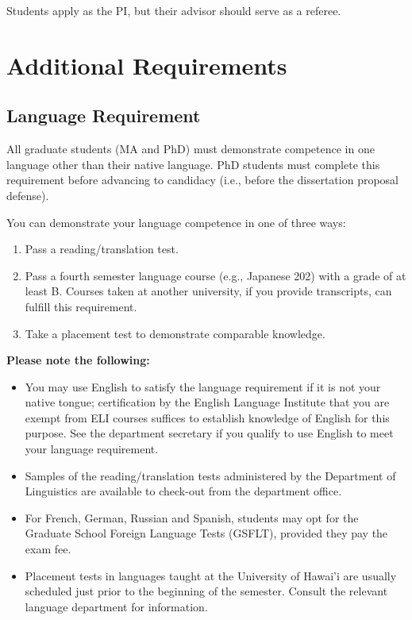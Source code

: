 \documentclass[
]{book}
\providecommand{\tightlist}{%
  \setlength{\itemsep}{0pt}\setlength{\parskip}{0pt}}
\begin{document}
Students apply as the PI, but their advisor should serve as a referee.

\chapter{Additional Requirements}\label{additional-requirements}

\section{Language Requirement}\label{language-requirement}

All graduate students (MA and PhD) must demonstrate competence in one language other than their native language. PhD students must complete this requirement before advancing to candidacy (i.e., before the dissertation proposal defense).

You can demonstrate your language competence in one of three ways:

\begin{enumerate}
\def\labelenumi{\arabic{enumi}.}
\tightlist
\item
  Pass a reading/translation test.
\item
  Pass a fourth semester language course (e.g., Japanese 202) with a grade of at least B. Courses taken at another university, if you provide transcripts, can fulfill this requirement.
\item
  Take a placement test to demonstrate comparable knowledge.
\end{enumerate}

\textbf{Please note the following:}

\begin{itemize}
\tightlist
\item
  You may use English to satisfy the language requirement if it is not your native tongue; certification by the English Language Institute that you are exempt from ELI courses suffices to establish knowledge of English for this purpose. See the department secretary if you qualify to use English to meet your language requirement.
\item
  Samples of the reading/translation tests administered by the Department of Linguistics are available to check-out from the department office.
\item
  For French, German, Russian and Spanish, students may opt for the Graduate School Foreign Language Tests (GSFLT), provided they pay the exam fee.
\item
  Placement tests in languages taught at the University of Hawai'i are usually scheduled just prior to the beginning of the semester. Consult the relevant language department for information.
\end{itemize}
\end{document}
